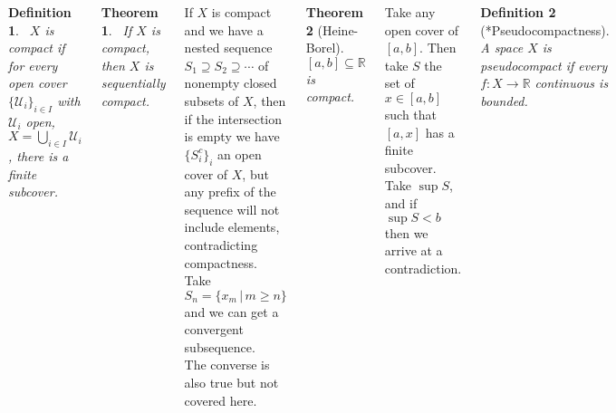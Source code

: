 \documentclass{tikzposter} %
\newtheorem{theorem}{Theorem}
\newtheorem{definition}{Definition}
\begin{document}
\begin{columns}
{    \begin{definition}
    \ $X$ is compact if for every open cover $\{\mathcal{U}_{i}\}_{i \in I}$ with $\mathcal{U}_{i}$ open, $X = \bigcup_{i \in I} \mathcal{U}_{i}$, there is a finite subcover.
    \end{definition}
    \hphantom{}

    \begin{theorem}
    \ If $X$ is compact, then $X$ is sequentially compact.
    \end{theorem}
    \hphantom{}

    If $X$ is compact and we have a nested sequence $S_{1} \supseteq S_{2} \supseteq \cdots$ of nonempty closed subsets of $X$, then if the intersection is empty we have $\{S_{i}^{c}\}_{i}$ an open cover of $X$, but any prefix of the sequence will not include elements, contradicting compactness. Take $S_{n} = \{x_{m} \,|\, m \ge n\}$ and we can get a convergent subsequence. \\

    The converse is also true but not covered here. \\

    \begin{theorem}[Heine-Borel]
      $[a,b] \subseteq \mathbb{R}$ is compact.
    \end{theorem}
    \hphantom{}

    Take any open cover of $[a,b]$. Then take $S$ the set of $x \in [a,b]$ such that $[a,x]$ has a finite subcover. Take $\sup S$, and if $\sup S < b$ then we arrive at a contradiction. \\

    \begin{definition}[*Pseudocompactness]
      A space $X$ is pseudocompact if every $f : X \to \mathbb{R}$ continuous is bounded.
    \end{definition}
  }

\end{columns}
\end{document}
